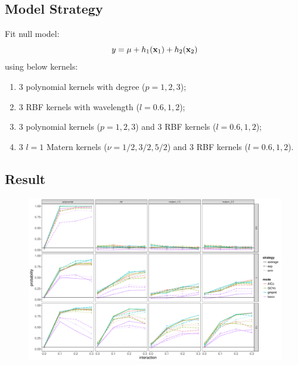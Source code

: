 \documentclass{beamer}
\begin{document}
\subsection{Model Strategy}
\begin{frame}
Fit null model:
$$y=\mu + h_1({\bf x}_1) + h_2({\bf x}_2)$$
using below kernels:
\begin{enumerate}
\item 3 polynomial kernels with degree ($p=1, 2, 3$); \hyperlink{poly}{}
\item 3 RBF kernels with wavelength ($l=0.6, 1, 2$); \hyperlink{rbf}{}
\item 3 polynomial kernels ($p=1, 2, 3$) and 3 RBF kernels ($l=0.6, 1, 2$); \hyperlink{poly_rbf}{}
\item 3 $l=1$ Matern kernels ($\nu=1/2, 3/2, 5/2$) and 3 RBF kernels ($l=0.6, 1, 2$). \hyperlink{mat_rbf}{}
\end{enumerate}
\end{frame}


\subsection{Result}
\begin{frame}
\label{poly}
\begin{figure}
\centering
\includegraphics[width=\linewidth]{"./plot/poly"}
\end{figure}
\end{frame}
\end{document}
